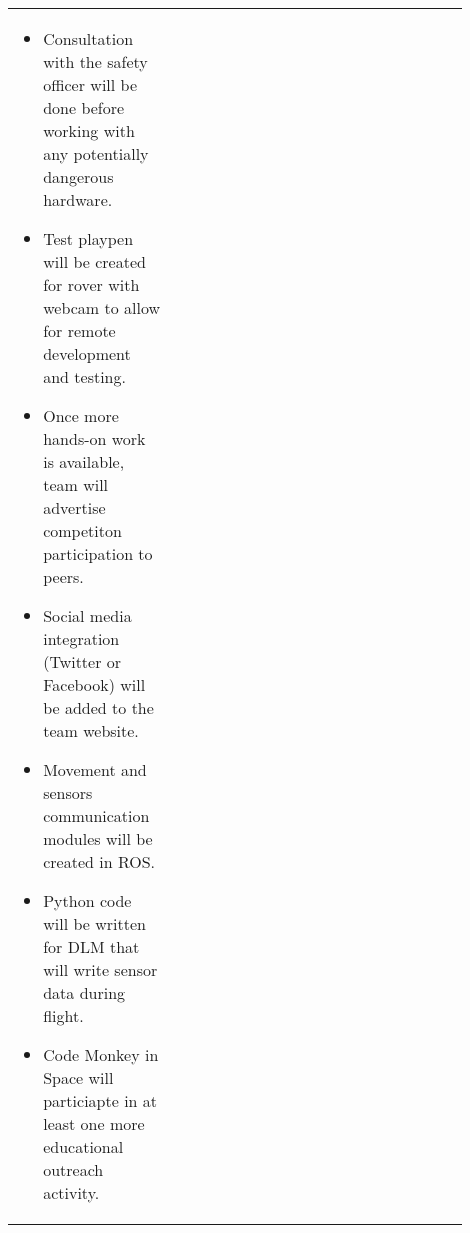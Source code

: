 \documentclass[onecolumn, draftclsnofoot,10pt, compsoc]{IEEEtran}
\newenvironment{myitemize}
{ \begin{itemize}
    \setlength{\itemsep}{0pt}
    \setlength{\parskip}{0pt}
    \setlength{\parsep}{0pt}     }
{ \end{itemize}                  }
\begin{document}
\begin{singlespacing}
\begin{tabular} {p{0.3\linewidth} p{0.3\linewidth} p{0.3\linewidth}}
\begin{myitemize}
\item Consultation with the safety officer will be done before working with any potentially dangerous hardware.
\item Test playpen will be created for rover with webcam to allow for remote development and testing.
\item Once more hands-on work is available, team will advertise competiton participation to peers.
\item Social media integration (Twitter or Facebook) will be added to the team website.
\item Movement and sensors communication modules will be created in ROS.
\item Python code will be written for DLM that will write sensor data during flight.
\item Code Monkey in Space will particiapte in at least one more educational outreach activity.
\vspace{-\baselineskip}\end{myitemize}
\end{tabular}
\end{singlespacing}
\end{document}
